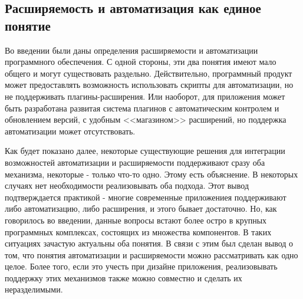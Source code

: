 \subsection{Расширяемость и автоматизация как единое понятие}
\label{sec:autom-and-ext-as-one-thing}

Во введении были даны определения расширяемости и автоматизации программного обеспечения. С одной стороны, эти два понятия имеют мало общего и могут существовать раздельно. Действительно, программный продукт может предоставлять возможность использовать скрипты для автоматизации, но не поддерживать плагины-расширения. Или наоборот, для приложения может быть разработана развитая система плагинов с автоматическим контролем и обновлением версий, с удобным <<магазином>> расширений, но поддержка автоматизации может отсутствовать.

Как будет показано далее, некоторые существующие решения для интеграции возможностей автоматизации и расширяемости поддерживают сразу оба механизма, некоторые - только что-то одно. Этому есть объяснение. В некоторых случаях нет необходимости реализовывать оба подхода. Этот вывод подтверждается практикой - многие современные приложениея поддерживают либо автоматизацию, либо расширения, и этого бывает достаточно. Но, как говорилось во введении, данные вопросы встают более остро в крупных программных комплексах, состоящих из множества компонентов. В таких ситуациях зачастую актуальны оба понятия. В связи с этим был сделан вывод о том, что понятия автоматизации и расширяемости можно рассматривать как одно целое. Более того, если это учесть при дизайне приложения, реализовывать поддержку этих механизмов также можно совместно и сделать их неразделимыми.



